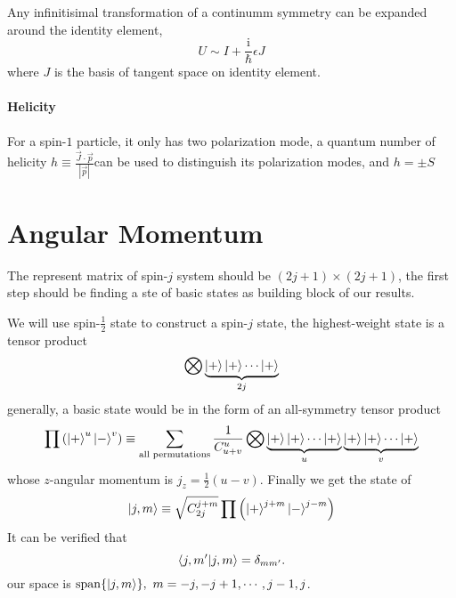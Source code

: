 
Any infinitisimal transformation of a continumm symmetry can be expanded around the identity element,
\begin{equation}
  U \sim I + \frac{\mathrm{i}}{\hbar} \epsilon J 
\end{equation}
where $J$ is the basis of tangent space on identity element.

\subsubsection[螺旋度]{Helicity}
For a spin-$1$ particle, it only has two polarization mode, a quantum number of helicity $h \equiv \frac{\vec{J}\cdot \vec{p}}{|\vec{p}|}$can be used to distinguish its polarization modes, and $h = \pm S$

\chapter[角动量]{Angular Momentum}

The represent matrix of spin-$j$ system should be $\left( 2j+1 \right) \times \left( 2j+1 \right)$, the first step should be finding a ste of basic states as building block of our results.

We will use spin-$\frac{1}{2}$ state to construct a spin-$j$ state, the highest-weight state is a tensor product
\begin{equation}
   \bigotimes \underbrace{\ket{+} \ket{+} \cdots \ket{+}}_{\text{$2j$}} 
\end{equation}
generally, a basic state would be in the form of an all-symmetry tensor product
\begin{equation}
   \prod \left( \ket{+}^{u} \ket{-}^{v} \right) \equiv \sum_{\text{all permutations}} \frac{1}{C_{u+v}^{u}}\bigotimes \underbrace{\ket{+} \ket{+} \cdots \ket{+}}_{u} \underbrace{\ket{+} \ket{+} \cdots \ket{+}}_{v}
\end{equation}
whose $z$-angular momentum is $j_{z} = \frac{1}{2} \left( u-v \right)$.
Finally we get the state of
\begin{equation}
  \ket{j, m} \equiv \sqrt{C_{2j}^{j+m}} \prod \left( \ket{+} ^{j+m} \ket{-}^{j-m} \right)
\end{equation}
It can be verified that
\begin{equation}
  \bra{j,m'} \ket{j,m} = \delta_{m m'}.
\end{equation}
our space is $\operatorname{span}\{ \ket{j,m} \}, \ m = -j, -j+1, \cdots , j-1, j$.

